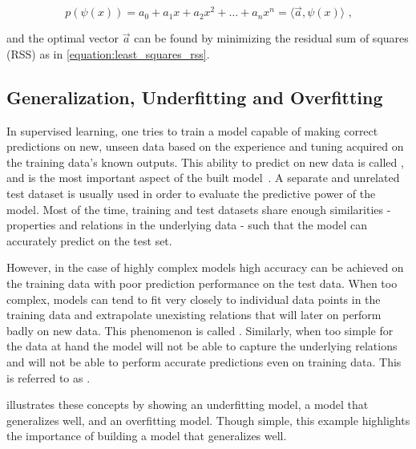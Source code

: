 \begin{equation}
    p(\psi(x)) = a_0 + a_1 x + a_2 x^2 + \ldots + a_n x^n = \langle \vec{a}, \psi(x) \rangle \text{ ,}
    \label{equation:polynomial_function_linear_mapping}
\end{equation}
\vspace{1pt}

\noindent
and the optimal vector \(\vec{a}\) can be found by minimizing the residual sum of squares (RSS) as in \cref{equation:least_squares_rss}.

\subsection{Generalization, Underfitting and Overfitting}
\label{subsection:generalization_underfitting_overfitting}

In supervised learning, one tries to train a model capable of making correct predictions on new, unseen data based on the experience and tuning acquired on the training data's known outputs.
This ability to predict on new data is called , and is the most important aspect of the built model~\cite{PR:Rosenblatt:Perceptron,BOOK:Bishop:Neural_Networks_Pattern_Recognition}.
A separate and unrelated test dataset is usually used in order to evaluate the predictive power of the model.
Most of the time, training and test datasets share enough similarities - properties and relations in the underlying data - such that the model can accurately predict on the test set.

However, in the case of highly complex models high accuracy can be achieved on the training data with poor prediction performance on the test data.
When too complex, models can tend to fit very closely to individual data points in the training data and extrapolate unexisting relations that will later on perform badly on new data.
This phenomenon is called .
Similarly, when too simple for the data at hand the model will not be able to capture the underlying relations and will not be able to perform accurate predictions even on training data.
This is referred to as .

 illustrates these concepts by showing an underfitting model, a model that generalizes well, and an overfitting model.
Though simple, this example highlights the importance of building a model that generalizes well.

